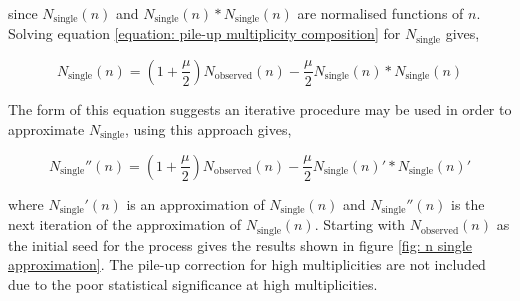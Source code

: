 since $N_\mathrm{single}(n)$ and $N_\mathrm{single}(n) \ast N_\mathrm{single}(n)$ are normalised functions of $n$. Solving equation \ref{equation: pile-up multiplicity composition} for $N_\mathrm{single}$ gives,

\begin{equation}
	N_\mathrm{single}(n) = (1 + \frac{\mu}{2}) N_\mathrm{observed}(n) - \frac{\mu}{2} N_\mathrm{single}(n) \ast N_\mathrm{single}(n)
\end{equation}

The form of this equation suggests an iterative procedure may be used in order to approximate $N_\mathrm{single}$, using this approach gives,

\begin{equation}
	N_\mathrm{single}''(n) = (1 + \frac{\mu}{2})N_\mathrm{observed}(n) - \frac{\mu}{2} N_\mathrm{single}(n)' \ast N_\mathrm{single}(n)'
\end{equation}

where $N_\mathrm{single}'(n)$ is an approximation of $N_\mathrm{single}(n)$ and $N_\mathrm{single}''(n)$ is the next iteration of the approximation of $N_\mathrm{single}(n)$. Starting with $N_\mathrm{observed}(n)$ as the initial seed for the process gives the results shown in figure \ref{fig: n single approximation}. The pile-up correction for high multiplicities are not included due to the poor statistical significance at high multiplicities.

